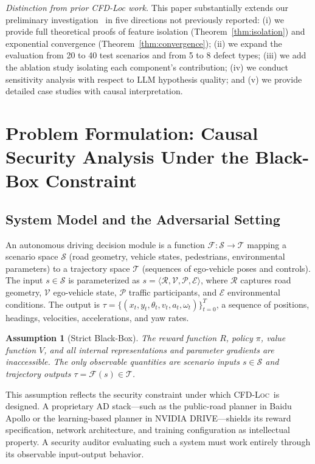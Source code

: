 \documentclass[journal]{IEEEtran}
\theoremstyle{plain}
\newtheorem{assumption}{Assumption}[section]
\newcommand{\methodname}{\textsc{CFD-Loc}}
\newcommand{\sys}{\mathcal{F}}
\begin{document}
\emph{Distinction from prior CFD-Loc work.} This paper substantially extends our preliminary investigation~\cite{remav2024} in five directions not previously reported: (i) we provide full theoretical proofs of feature isolation (Theorem~\ref{thm:isolation}) and exponential convergence (Theorem~\ref{thm:convergence}); (ii) we expand the evaluation from 20 to 40 test scenarios and from 5 to 8 defect types; (iii) we add the ablation study isolating each component's contribution; (iv) we conduct sensitivity analysis with respect to LLM hypothesis quality; and (v) we provide detailed case studies with causal interpretation.

\section{Problem Formulation: Causal Security Analysis Under the Black-Box Constraint}

\subsection{System Model and the Adversarial Setting}

An autonomous driving decision module is a function $\sys: \mathcal{S} \to \mathcal{T}$ mapping a scenario space $\mathcal{S}$ (road geometry, vehicle states, pedestrians, environmental parameters) to a trajectory space $\mathcal{T}$ (sequences of ego-vehicle poses and controls). The input $s \in \mathcal{S}$ is parameterized as $s = \langle \mathcal{R}, \mathcal{V}, \mathcal{P}, \mathcal{E} \rangle$, where $\mathcal{R}$ captures road geometry, $\mathcal{V}$ ego-vehicle state, $\mathcal{P}$ traffic participants, and $\mathcal{E}$ environmental conditions. The output is $\tau = \{(x_t,y_t,\theta_t,v_t,a_t,\omega_t)\}_{t=0}^T$, a sequence of positions, headings, velocities, accelerations, and yaw rates.

\begin{assumption}[Strict Black-Box]\label{assump:blackbox}
The reward function $R$, policy $\pi$, value function $V$, and all internal representations and parameter gradients are inaccessible. The only observable quantities are scenario inputs $s \in \mathcal{S}$ and trajectory outputs $\tau = \sys(s) \in \mathcal{T}$.
\end{assumption}

This assumption reflects the security constraint under which \methodname\ is designed. A proprietary AD stack---such as the public-road planner in Baidu Apollo or the learning-based planner in NVIDIA DRIVE---shields its reward specification, network architecture, and training configuration as intellectual property. A security auditor evaluating such a system must work entirely through its observable input-output behavior.
\end{document}
